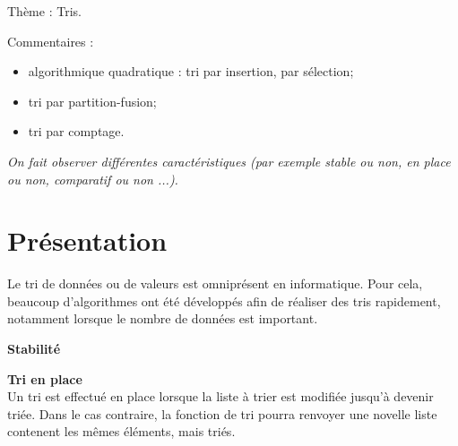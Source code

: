 \fichetrue
\proftrue
\tdfalse
\coursfalse

\def\xxnumchapitre{Semestre 1 \vspace{.2cm}}
\def\xxchapitre{\hspace{.12cm} Thèmes d'étude 9 -- Tris}
\def\xxYCartouche{-2.25cm}
\def\xxposongletx{2}
\def\xxposonglettext{1.45}
\def\xxposonglety{19}%

\def\xxonglet{\textsf{S1 -- Ch. 9}}

\def\xxactivite{Fiche}


\def\xxpied{%
Fonctions récursives-- \xxactivite%
}

\setcounter{secnumdepth}{5}


%
%
\vspace{1.5cm}
\pagestyle{fancy}
\thispagestyle{plain}
\setcounter{section}{0}



Thème : Tris.
 
Commentaires :
\begin{itemize}
\item algorithmique quadratique : tri par insertion, par sélection;
\item tri par partition-fusion;
\item tri par comptage.
\end{itemize}
\textit{On fait observer différentes caractéristiques (par exemple stable ou non, en place ou non, comparatif ou non ...).}


\section{Présentation}
Le tri de données ou de valeurs est omniprésent en informatique. Pour cela, beaucoup d'algorithmes ont été développés afin de réaliser des tris rapidement, notamment lorsque le nombre de données est important.
\begin{defi}\textbf{Stabilité}

\end{defi}

\begin{defi}\textbf{Tri en place} \\
Un tri est effectué en place lorsque la liste à trier est modifiée jusqu'à devenir triée. Dans le cas contraire, la fonction de tri pourra renvoyer une novelle liste contenent les mêmes éléments, mais triés. 
\end{defi}

